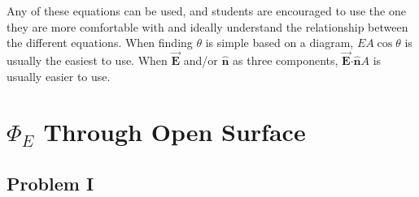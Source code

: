 \documentclass{article}
\newcommand{\bfvec}[1]{\vec{\mathbf{#1}}}
\newcommand{\bfcdot}[0]{\boldsymbol{\cdot}}
\begin{document}
Any of these equations can be used, and students are encouraged to use the one they are more comfortable with and ideally understand the relationship between the different equations. When finding $\theta$ is simple based on a diagram, $EA\cos\theta$ is usually the easiest to use. When $\bfvec{E}$ and/or $\hat{\mathbf{n}}$ as three components, $\bfvec{E}\bfcdot \hat{\mathbf{n}}A$ is usually easier to use.

\newpage

\section{$\Phi_E$ Through Open Surface}

\subsection{Problem I}
\end{document}
